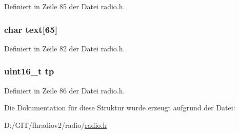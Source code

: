 Definiert in Zeile 85 der Datei radio.\+h.

\hypertarget{structradio__rds_a1d7cd4d36a6a2fa49631cef5d5847187}{}
\subsubsection[{text}]{\setlength{\rightskip}{0pt plus 5cm}char text\mbox{[}65\mbox{]}}\label{structradio__rds_a1d7cd4d36a6a2fa49631cef5d5847187}


Definiert in Zeile 82 der Datei radio.\+h.

\hypertarget{structradio__rds_a92aabb0ca71171ea02dd5cf0ada0d536}{}
\subsubsection[{tp}]{\setlength{\rightskip}{0pt plus 5cm}uint16\+\_\+t tp}\label{structradio__rds_a92aabb0ca71171ea02dd5cf0ada0d536}


Definiert in Zeile 86 der Datei radio.\+h.



Die Dokumentation für diese Struktur wurde erzeugt aufgrund der Datei\+:\begin{DoxyCompactItemize}
\item 
D\+:/\+G\+I\+T/fhradiov2/radio/\hyperlink{radio_8h}{radio.\+h}\end{DoxyCompactItemize}
